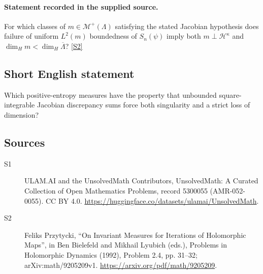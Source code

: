 \documentclass[11pt]{article}
\newcommand{\sref}[2]{\hyperlink{source:#1:#2}{[S#2]}}
\begin{document}
\paragraph{Statement recorded in the supplied source.}
For which classes of $m\in\mathcal M^+(\Lambda)$ satisfying the stated Jacobian hypothesis does failure of uniform $L^2(m)$ boundedness of $S_n(\psi)$ imply both $m\perp\mathcal H^\kappa$ and $\dim_Hm<\dim_H\overline\Lambda$? \sref{5300055}{2}
\subsection{Short English statement}
Which positive-entropy measures have the property that unbounded square-integrable Jacobian discrepancy sums force both singularity and a strict loss of dimension?
\subsection{Sources}
\begin{description}
\item[\hypertarget{source:5300055:1}{S1}] ULAM.AI and the UnsolvedMath Contributors, UnsolvedMath: A Curated Collection of Open Mathematics Problems, record 5300055 (AMR-052-0055). CC BY 4.0. \url{https://huggingface.co/datasets/ulamai/UnsolvedMath}.
\item[\hypertarget{source:5300055:2}{S2}] Feliks Przytycki, ``On Invariant Measures for Iterations of Holomorphic Maps'', in Ben Bielefeld and Mikhail Lyubich (eds.), Problems in Holomorphic Dynamics (1992), Problem 2.4, pp. 31--32; arXiv:math/9205209v1. \url{https://arxiv.org/pdf/math/9205209}.
\end{description}
\label{end:5300055}
\end{document}
